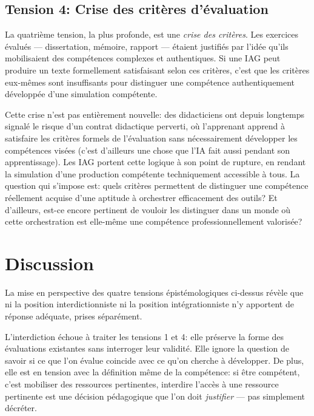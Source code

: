 \subsection*{Tension 4: Crise des crit\`eres d'\'evaluation}

La quatri\`eme tension, la plus profonde, est une \emph{crise des crit\`eres}. 
Les exercices \'evalu\'es --- dissertation, m\'emoire, rapport --- \'etaient justifi\'es par l'id\'ee qu'ils mobilisaient des comp\'etences complexes et authentiques. 
Si une IAG peut produire un texte formellement satisfaisant selon ces crit\`eres, c'est que les crit\`eres eux-m\^emes sont insuffisants pour distinguer une comp\'etence authentiquement d\'evelopp\'ee d'une simulation comp\'etente.

Cette crise n'est pas enti\`erement nouvelle: des didacticiens ont depuis longtemps signal\'e le risque d'un \og{}contrat didactique perverti\fg{}, o\`u l'apprenant apprend \`a satisfaire les crit\`eres formels de l'\'evaluation sans n\'ecessairement d\'evelopper les comp\'etences vis\'ees (c'est d'ailleurs une chose que l'IA fait aussi pendant son apprentissage). 
Les IAG portent cette logique \`a son point de rupture, en rendant la simulation d'une production comp\'etente techniquement accessible \`a tous. 
La question qui s'impose est: quels crit\`eres permettent de distinguer une comp\'etence r\'eellement acquise d'une aptitude \`a orchestrer efficacement des outils? 
Et d'ailleurs, est-ce encore pertinent de vouloir les distinguer dans un monde o\`u cette orchestration est elle-m\^eme une comp\'etence professionnellement valoris\'ee?


\newpage
\section{Discussion}\label{sec:discussion}


La mise en perspective des quatre tensions \'epist\'emologiques ci-dessus r\'ev\`ele que ni la position interdictionniste ni la position int\'egrationniste n'y apportent de r\'eponse ad\'equate, prises s\'epar\'ement.

L'interdiction \'echoue \`a traiter les tensions 1 et 4: elle pr\'eserve la forme des \'evaluations existantes sans interroger leur validit\'e. 
Elle ignore la question de savoir si ce que l'on \'evalue coincide avec ce qu'on cherche \`a d\'evelopper. 
De plus, elle est en tension avec la d\'efinition m\^eme de la comp\'etence: si \^etre comp\'etent, c'est mobiliser des ressources pertinentes, interdire l'acc\`es \`a une ressource pertinente est une d\'ecision p\'edagogique que l'on doit \emph{justifier} --- pas simplement d\'ecr\'eter.


